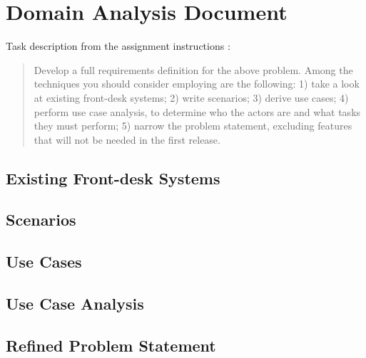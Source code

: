 %
%
%


\section{Domain Analysis Document}
Task description from the assignment instructions
\cite{2dv603:assignment1-instructions}:

\begin{quote}
  Develop a full requirements definition for the above problem. Among the
  techniques you should consider employing are the following: 1) take a look at
  existing front-desk systems; 2) write scenarios; 3) derive use cases; 4)
  perform use case analysis, to determine who the actors are and what tasks
  they must perform; 5) narrow the problem statement, excluding features that
  will not be needed in the first release.
\end{quote}


\subsection{Existing Front-desk Systems}
%
%


\subsection{Scenarios}
%
%


\subsection{Use Cases}
%
%
%


\subsection{Use Case Analysis}
%
%


\subsection{Refined Problem Statement}
%
%
